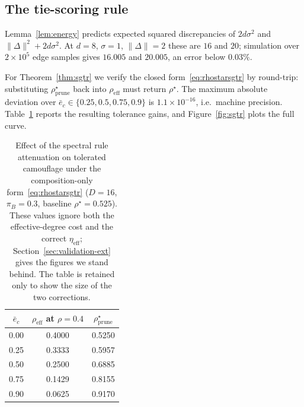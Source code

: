 \documentclass[../elsevier.tex]{subfiles}
\begin{document}
\subsection{The tie-scoring rule}

Lemma~\ref{lem:energy} predicts expected squared discrepancies of $2d\sigma^2$ and
$\|\Delta\|^2 + 2d\sigma^2$. At $d = 8$, $\sigma = 1$, $\|\Delta\| = 2$ these are
$16$ and $20$; simulation over $2\times10^5$ edge samples gives $16.005$ and
$20.005$, an error below $0.03\%$.

For Theorem~\ref{thm:sgtr} we verify the closed
form~\eqref{eq:rhostarsgtr} by round-trip: substituting
$\rho^\star_{\mathrm{prune}}$ back into $\rho_{\mathrm{eff}}$ must return
$\rho^\star$. The maximum absolute deviation over
$\bar e_c \in \{0.25, 0.5, 0.75, 0.9\}$ is $1.1\times 10^{-16}$, i.e.\ machine
precision. Table~\ref{tab:sgtr} reports the resulting tolerance gains, and
Figure~\ref{fig:sgtr} plots the full curve.

\begin{table}[t]
\centering
\caption{Effect of the spectral rule attenuation on tolerated camouflage under the
composition-only form~\eqref{eq:rhostarsgtr} ($D=16$, $\pi_B=0.3$, baseline
$\rho^\star = 0.525$). These values ignore both the effective-degree cost and the
correct $\eta_{\mathrm{eff}}$; Section~\ref{sec:validation-ext} gives the figures
we stand behind. The table is retained only to show the size of the two corrections.}
\label{tab:sgtr}
\small
\begin{tabular}{@{}ccc@{}}
\toprule
$\bar e_c$ & $\rho_{\mathrm{eff}}$ at $\rho = 0.4$ & $\rho^\star_{\mathrm{prune}}$ \\
\midrule
0.00 & 0.4000 & 0.5250 \\
0.25 & 0.3333 & 0.5957 \\
0.50 & 0.2500 & 0.6885 \\
0.75 & 0.1429 & 0.8155 \\
0.90 & 0.0625 & 0.9170 \\
\bottomrule
\end{tabular}
\end{table}
\end{document}

